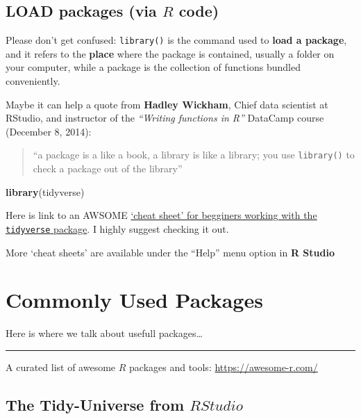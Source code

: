 \documentclass[]{book}
\newenvironment{Shaded}{\begin{snugshade}}{\end{snugshade}}
\newcommand{\KeywordTok}[1]{\textcolor[rgb]{0.13,0.29,0.53}{\textbf{#1}}}
\newcommand{\NormalTok}[1]{#1}
\theoremstyle{definition}
\theoremstyle{definition}
\theoremstyle{definition}
\theoremstyle{remark}
\begin{document}
\section{\texorpdfstring{LOAD packages (via \(R\)
code)}{LOAD packages (via R code)}}\label{load-packages-via-r-code}

Please don't get confused: \texttt{library()} is the command used to
\textbf{load a package}, and it refers to the \textbf{place} where the
package is contained, usually a folder on your computer, while a package
is the collection of functions bundled conveniently.

Maybe it can help a quote from \textbf{Hadley Wickham}, Chief data
scientist at RStudio, and instructor of the \emph{``Writing functions in
R''} DataCamp course (December 8, 2014):

\begin{quote}
``a package is a like a book, a library is like a library; you use
\texttt{library()} to check a package out of the library''
\end{quote}

\begin{Shaded}
\begin{Highlighting}[]
\KeywordTok{library}\NormalTok{(tidyverse)}
\end{Highlighting}
\end{Shaded}

Here is link to an AWSOME
\href{http://datacamp-community.s3.amazonaws.com/e63a8f6b-2aa3-4006-89e0-badc294b179c}{`cheat
sheet' for begginers working with the \texttt{tidyverse} package}. I
highly suggest checking it out.

More `cheat sheets' are available under the ``Help'' menu option in
\textbf{R Studio}

\chapter{Commonly Used Packages}\label{commonly-used-packages}

Here is where we talk about usefull packages\ldots{}

\begin{center}\rule{0.5\linewidth}{\linethickness}\end{center}

A curated list of awesome \(R\) packages and tools:
\url{https://awesome-r.com/}

\section{\texorpdfstring{The Tidy-Universe from
\(R Studio\)}{The Tidy-Universe from R Studio}}\label{the-tidy-universe-from-r-studio}
\end{document}
